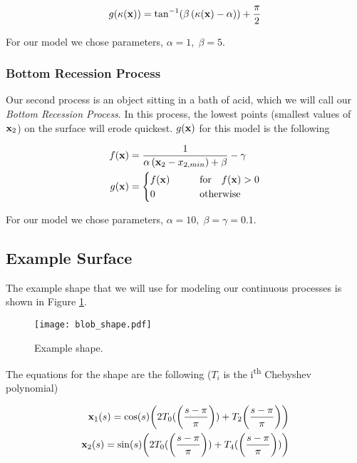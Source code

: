 \begin{equation}
g(\kappa(\mathbf{x})) = \tan^{-1}(\beta \, (\kappa(\mathbf{x}) - \alpha)) + \frac{\pi}{2}
\end{equation}

For our model we chose parameters, $\alpha = 1, \; \beta = 5$.

\subsubsection*{Bottom Recession Process}

Our second process is an object sitting in a bath of acid, which we will call our \textit{Bottom Recession Process}. In this process, the lowest points (smallest values of $\mathbf{x}_2$) on the surface will erode quickest. $g(\mathbf{x})$ for this model is the following

\begin{align}
  f(\mathbf{x})& = \frac{1}{\alpha \, (\mathbf{x}_2 - x_{2, min}) + \beta} - \gamma\\
  g(\mathbf{x})& = \begin{cases}
    f(\mathbf{x}) \qquad &\text{for} \quad f(\mathbf{x}) > 0\\
    0 \qquad &\text{otherwise}
  \end{cases}
\end{align}

For our model we chose parameters, $\alpha = 10, \; \beta = \gamma = 0.1$.

\subsection*{Example Surface}

The example shape that we will use for modeling our continuous processes is shown in Figure \ref{fig:blob-shape}.

\begin{figure}[H]
    \begin{center}
      \texttt{[image: blob\_shape.pdf]}
    \end{center}
  \vspace{-.2in} %
  \caption{\label{fig:blob-shape} Example shape.}
\end{figure}

The equations for the shape are the following ($T_i$ is the i\textsuperscript{th} Chebyshev polynomial)

\begin{align*}
  \bvec{x}_1(s) = \cos(s) \paren{2 T_0(\paren{\frac{s-\pi}{\pi}}) + T_2\paren{\frac{s-\pi}{\pi}}}\\
  \bvec{x}_2(s) = \sin(s) \paren{2 T_0(\paren{\frac{s-\pi}{\pi}}) + T_4(\paren{\frac{s-\pi}{\pi}})}
\end{align*}

